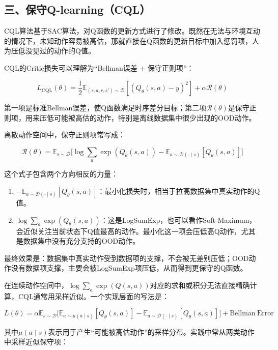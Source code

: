 \hypertarget{ux4e09ux4fddux5b88q-learningcql}{%
\subsection{三、保守Q-learning（CQL）}\label{ux4e09ux4fddux5b88q-learningcql}}

CQL算法基于SAC算法，对Q函数的更新方式进行了修改。既然在无法与环境互动的情况下，未知动作容易被高估，那就直接在Q函数的更新目标中加入惩罚项，人为压低没见过的动作的Q值。

CQL的Critic损失可以理解为``Bellman误差 + 保守正则项''：

\[
L_{\mathrm{CQL}}(\theta)
=\frac{1}{2}\mathbb{E}_{(s,a,r,s')\sim\mathcal D}
[(Q_\theta(s,a)-y)^{2}]
+\alpha \mathcal R(\theta)
\]

第一项是标准Bellman误差，使Q函数满足时序差分目标；第二项\(\mathcal R(\theta)\)是保守正则项，用来压低可能被高估的动作，特别是离线数据集中很少出现的OOD动作。

离散动作空间中，保守正则项常写成：

\[
\mathcal R(\theta)
=\mathbb{E}_{s\sim\mathcal D}
\bigl[
\log \sum_a \exp(Q_\theta(s,a))
-\mathbb{E}_{a\sim\mathcal D(\cdot\mid s)}[Q_\theta(s,a)]
\bigr]
\]

这个式子包含两个方向相反的力量：

\begin{enumerate}
\def\labelenumi{\arabic{enumi}.}
\tightlist
\item
  \(-\mathbb{E}_{a\sim\mathcal D(\cdot\mid s)}[Q_\theta(s,a)]\)：最小化损失时，相当于拉高数据集中真实动作的Q值。
\item
  \(\log \sum_a \exp(Q_\theta(s,a))\)：这是LogSumExp，也可以看作Soft-Maximum，会近似关注当前状态下Q值最高的动作。最小化这一项会压低高Q动作，尤其是数据集中没有充分支持的OOD动作。
\end{enumerate}

最终效果是：数据集中真实动作受到数据项的支撑，不会被无差别压低；OOD动作没有数据项支撑，主要会被LogSumExp项压低，从而得到更保守的Q函数。

在连续动作空间中，\(\log\sum_a\exp(Q(s,a))\)对应的求和或积分无法直接精确计算，CQL通常用采样近似。一个实现层面的写法是：

\[
L(\theta)
=\alpha\mathbb{E}_{s\sim\mathcal D}
\bigl[
\mathbb{E}_{a\sim\mu(a\mid s)}[Q_\theta(s,a)]
-\mathbb{E}_{a\sim\mathcal D(\cdot\mid s)}[Q_\theta(s,a)]
\bigr]
+\mathrm{Bellman\ Error}
\]

其中\(\mu(a\mid s)\)表示用于产生``可能被高估动作''的采样分布。实践中常从两类动作中采样近似保守项：

